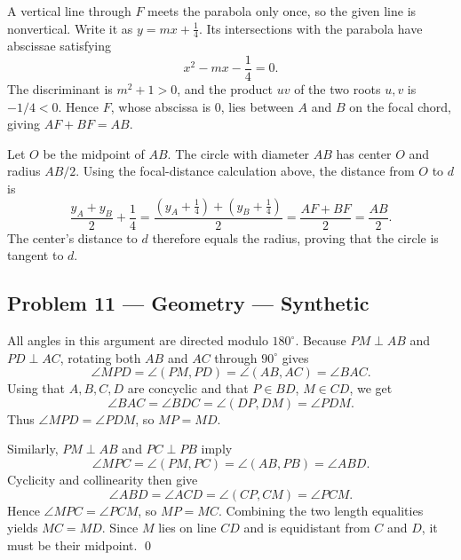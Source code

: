 \documentclass[11pt,a4paper]{article}
\newcommand{\solution}[2]{\subsection*{Problem #1 --- #2}}
\begin{document}
A vertical line through $F$ meets the parabola only once, so the given line
is nonvertical. Write it as $y=mx+\frac14$. Its intersections with the
parabola have abscissae satisfying
\[
  x^2-mx-\frac14=0.
\]
The discriminant is $m^2+1>0$, and the product $uv$ of the two roots $u,v$
is $-1/4<0$. Hence $F$, whose abscissa is $0$, lies between $A$ and $B$ on
the focal chord, giving $AF+BF=AB$.

Let $O$ be the midpoint of $AB$. The circle with diameter $AB$ has center $O$
and radius $AB/2$. Using the focal-distance calculation above, the distance
from $O$ to $d$ is
\[
  \frac{y_A+y_B}{2}+\frac14
  =\frac{(y_A+\frac14)+(y_B+\frac14)}2
  =\frac{AF+BF}{2}
  =\frac{AB}{2}.
\]
The center's distance to $d$ therefore equals the radius, proving that the
circle is tangent to $d$.

\solution{11}{Geometry --- Synthetic}
All angles in this argument are directed modulo $180^\circ$. Because
$PM\perp AB$ and $PD\perp AC$, rotating both $AB$ and $AC$ through $90^\circ$
gives
\[
  \angle MPD=\angle(PM,PD)=\angle(AB,AC)=\angle BAC.
\]
Using that $A,B,C,D$ are concyclic and that $P\in BD$, $M\in CD$, we get
\[
  \angle BAC=\angle BDC=\angle(DP,DM)=\angle PDM.
\]
Thus $\angle MPD=\angle PDM$, so $MP=MD$.

Similarly, $PM\perp AB$ and $PC\perp PB$ imply
\[
  \angle MPC=\angle(PM,PC)=\angle(AB,PB)=\angle ABD.
\]
Cyclicity and collinearity then give
\[
  \angle ABD=\angle ACD=\angle(CP,CM)=\angle PCM.
\]
Hence $\angle MPC=\angle PCM$, so $MP=MC$. Combining the two length
equalities yields $MC=MD$. Since $M$ lies on line $CD$ and is equidistant from
$C$ and $D$, it must be their midpoint. \qed
\end{document}
